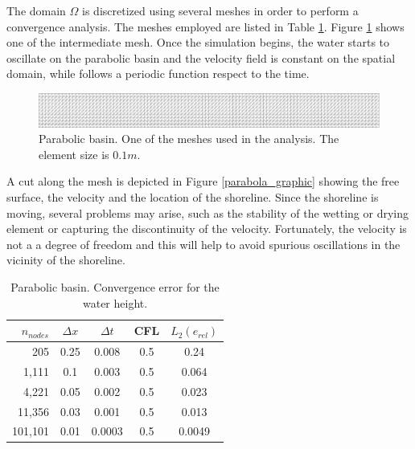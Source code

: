 The domain $\Omega$ is discretized using several meshes in order to perform a convergence analysis. The meshes employed are listed in Table \ref{parabola_convergence_tab}. Figure \ref{parabola_mesh} shows one of the intermediate mesh. Once the simulation begins, the water starts to oscillate on the parabolic basin and the velocity field is constant on the spatial domain, while follows a periodic function respect to the time.

\begin{figure}
    \includegraphics[width=\textwidth]{img/eulerian/par/mesh_0.1.pdf}
    \caption{Parabolic basin. One of the meshes used in the analysis. The element size is $0.1m$.}
    \label{parabola_mesh}
\end{figure}


A cut along the mesh is depicted in Figure \ref{parabola_graphic} showing the free surface, the velocity and the location of the shoreline.
Since the shoreline is moving, several problems may arise, such as the stability of the wetting or drying element or capturing the discontinuity of the velocity. Fortunately, the velocity is not a a degree of freedom and this will help to avoid spurious oscillations in the vicinity of the shoreline.



\begin{table} [htb]
    \centering
    \begin{tabular}{>{\small}rcccc} \hline
    $n_{nodes}$ & $\Delta x$ & $\Delta t$ & CFL & $L_2(e_{rel})$ \\ \hline
205 & 0.25 & 0.008 & 0.5 & 0.24 \\
1,111 & 0.1 & 0.003 & 0.5 & 0.064 \\
4,221 & 0.05 & 0.002 & 0.5 & 0.023 \\
11,356 & 0.03 & 0.001 & 0.5 & 0.013 \\
101,101 & 0.01 & 0.0003 & 0.5 & 0.0049 \\
    \hline
    \end{tabular}
    \caption{Parabolic basin. Convergence error for the water height.}
    \label{parabola_convergence_tab}
\end{table}

